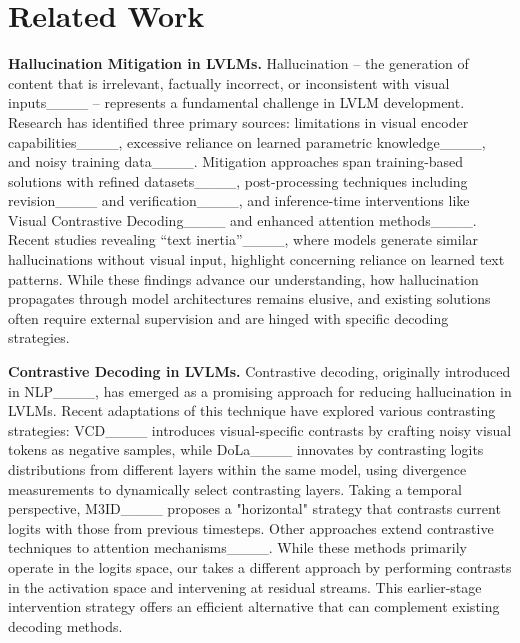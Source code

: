 \section{Related Work}
\label{sec:related_work}

\textbf{Hallucination Mitigation in LVLMs.} 
Hallucination -- the generation of content that is irrelevant, factually incorrect, or inconsistent with visual inputs____ -- represents a fundamental challenge in LVLM development. Research has identified three primary sources: limitations in visual encoder capabilities____, excessive reliance on learned parametric knowledge____, and noisy training data____. Mitigation approaches span training-based solutions with refined datasets____, post-processing techniques including revision____ and verification____, and inference-time interventions like Visual Contrastive Decoding____ and enhanced attention methods____. Recent studies revealing ``text inertia''____, where models generate similar hallucinations without visual input, highlight concerning reliance on learned text patterns. While these findings advance our understanding, how hallucination propagates through model architectures remains elusive, and existing solutions often require external supervision and are hinged with specific decoding strategies.

\textbf{Contrastive Decoding in LVLMs.} 
Contrastive decoding, originally introduced in NLP____, has emerged as a promising approach for reducing hallucination in LVLMs. Recent adaptations of this technique have explored various contrasting strategies: VCD____ introduces visual-specific contrasts by crafting noisy visual tokens as negative samples, while DoLa____ innovates by contrasting logits distributions from different layers within the same model, using divergence measurements to dynamically select contrasting layers. Taking a temporal perspective, M3ID____ proposes a "horizontal" strategy that contrasts current logits with those from previous timesteps. Other approaches extend contrastive techniques to attention mechanisms____. While these methods primarily operate in the logits space, our \ours takes a different approach by performing contrasts in the activation space and intervening at residual streams. This earlier-stage intervention strategy offers an efficient alternative that can complement existing decoding methods.
